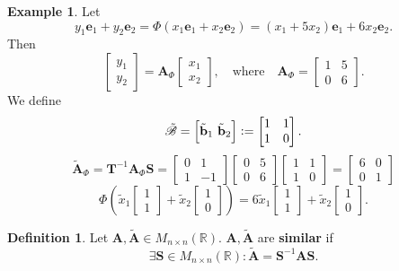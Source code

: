 \documentclass[12pt,openany]{book}
\theoremstyle{definition}
\newtheorem{definition}{Definition}[chapter]
\newtheorem{example}{Example}[chapter]
\newcommand{\R}{\mathbb{R}}
\newcommand{\of}[1]{\left( #1 \right)}
\newcommand{\by}{\times}
\newcommand{\basis}{\mathscr{B}}
\begin{document}
	\begin{example}
		Let \[
		y_1\textbf{e}_1+y_2\textbf{e}_2=\Phi(x_1\textbf{e}_1+x_2\textbf{e}_2)=(x_1+5x_2)\textbf{e}_1+6x_2\textbf{e}_2.
		\] Then \[\begin{bmatrix}
			y_1\\ y_2
		\end{bmatrix}=\textbf{A}_\Phi\begin{bmatrix}
	x_1 \\ x_2
\end{bmatrix},\quad\text{where}\quad
\textbf{A}_\Phi=\begin{bmatrix}
	1 & 5\\ 0 & 6
\end{bmatrix}.
		\] We define \[
		\tilde{\basis}=\sbr{\tilde{\textbf{b}}_1\ \tilde{\textbf{b}}_2}:=\begin{bmatrix}
			1 & 1\\ 1 & 0
		\end{bmatrix}.
		\]\[
		\tilde{\textbf{A}}_\Phi=\textbf{T}^{-1}\textbf{A}_\Phi\textbf{S}=
		\begin{bmatrix}
			0 & 1\\ 1 & -1
		\end{bmatrix}\begin{bmatrix}
		0 & 5\\ 0 & 6
	\end{bmatrix}\begin{bmatrix}
	1 & 1\\ 1 & 0
\end{bmatrix}=\begin{bmatrix}
6 & 0\\ 0 & 1
\end{bmatrix}
		\] \[
		\Phi\of{\tilde{x}_1\begin{bmatrix}
			1 \\ 1
		\end{bmatrix}+\tilde{x}_2\begin{bmatrix}
		1 \\ 0
	\end{bmatrix}}=6\tilde{x}_1\begin{bmatrix}
1 \\ 1
\end{bmatrix}+\tilde{x}_2\begin{bmatrix}
1 \\ 0
\end{bmatrix}.
		\]
	\end{example}

	\begin{tcolorbox}[colframe=defcolor,title={\color{white}\bf Similarity}]
		\begin{definition}
			Let \(\textbf{A},\tilde{\textbf{A}}\in M_{n\by n}(\R)\). \(\textbf{A},\tilde{\textbf{A}}\) are \textbf{similar} if \[
			\exists\textbf{S}\in M_{n\by n}(\R):\tilde{\textbf{A}}=\textbf{S}^{-1}\textbf{A}\textbf{S}.
			\]
		\end{definition}
	\end{tcolorbox}
	
\end{document}
